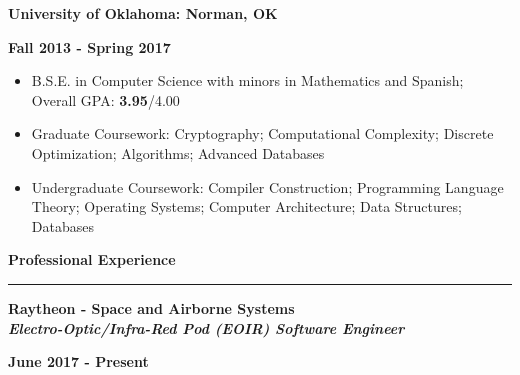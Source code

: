\documentclass[10pt,letterpaper]{article}
\begin{document}
\begin{minipage}[t]{0.5\textwidth}
    \begin{flushleft}
        \textbf{University of Oklahoma: Norman, OK}\\

    \end{flushleft}
\end{minipage}
\begin{minipage}[t]{0.47\textwidth}
    \begin{flushright}
        \textbf{Fall 2013 - Spring 2017}

    \end{flushright}
\end{minipage}
\begin{itemize}[topsep=0pt]
    \setlength\itemsep{-0.10em}
    \item B.S.E. in Computer Science with minors in Mathematics and Spanish; Overall GPA: \textbf{3.95}/{4.00}
    \item Graduate Coursework: Cryptography; Computational Complexity; Discrete Optimization;
        Algorithms; Advanced Databases
    \item Undergraduate Coursework: Compiler Construction; Programming Language Theory;
        Operating Systems; Computer Architecture; Data Structures; Databases
\end{itemize}

\medskip

\begin{large}
    \textbf{Professional Experience}
\end{large}

\smallskip \hrule \smallskip

\begin{minipage}[t]{0.53\textwidth}
    \begin{flushleft}
        \textbf{Raytheon - Space and Airborne Systems}\\
        \textbf{\textit{Electro-Optic/Infra-Red Pod (EOIR) Software Engineer}}\\
    \end{flushleft}
\end{minipage}
\begin{minipage}[t]{0.44\textwidth}
    \begin{flushright}
        \textbf{June 2017 - Present}
    \end{flushright}
\end{minipage}
\end{document}
